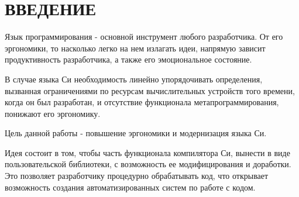 \chapter*{ВВЕДЕНИЕ}                         %




Язык программирования - основной инструмент любого разработчика. От его эргономики, то насколько легко на нем излагать идеи, напрямую зависит продуктивность разработчика, а также его эмоциональное состояние.

В случае языка Си необходимость линейно упорядочивать определения, вызванная ограничениями по ресурсам вычислительных устройств того времени, когда он был разработан, 
и отсутствие функционала метапрограммирования, понижают его эргономику.

Цель данной работы - повышение эргономики и модернизация языка Си.


Идея состоит в том, чтобы часть функционала компилятора Си, вынести в виде пользовательской библиотеки, с возможность ее модифицирования и доработки. 
Это позволяет разработчику процедурно обрабатывать код, что открывает возможность создания автоматизированных систем по работе с кодом.

